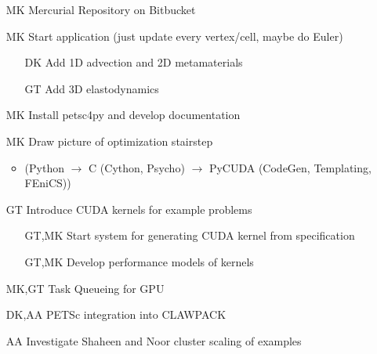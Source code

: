 \documentclass[12pt]{article}
\begin{document}
\begin{itemize}
  \item[MK] Mercurial Repository on Bitbucket

  \item[MK] Start application (just update every vertex/cell, maybe do Euler)
  \begin{itemize}
    \item[DK] Add 1D advection and 2D metamaterials

    \item[GT] Add 3D elastodynamics
  \end{itemize}

  \item[MK] Install petsc4py and develop documentation

  \item[MK] Draw picture of optimization stairstep
  \begin{itemize}
    \item (Python $\to$ C (Cython, Psycho) $\to$ PyCUDA (CodeGen, Templating, FEniCS))
  \end{itemize}

  \item[GT] Introduce CUDA kernels for example problems
  \begin{itemize}
    \item[GT,MK] Start system for generating CUDA kernel from specification

    \item[GT,MK] Develop performance models of kernels
  \end{itemize}

  \item[MK,GT] Task Queueing for GPU

  \item[DK,AA] PETSc integration into CLAWPACK

  \item[AA] Investigate Shaheen and Noor cluster scaling of examples
\end{itemize}
\end{document}

